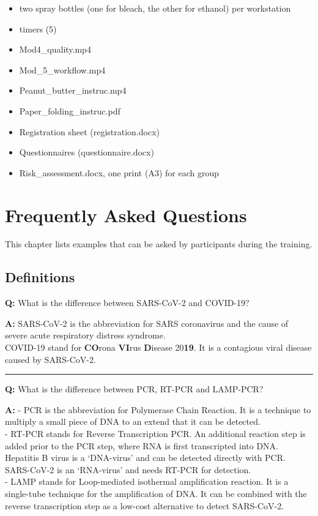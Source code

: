 \documentclass[
]{book}
\begin{document}
\begin{itemize}
\item
  two spray bottles (one for bleach, the other for ethanol) per workstation
\item
  timers (5)
\item
  Mod4\_quality.mp4
\item
  Mod\_5\_workflow.mp4
\item
  Peanut\_butter\_instruc.mp4
\item
  Paper\_folding\_instruc.pdf
\item
  Registration sheet (registration.docx)
\item
  Questionnaires (questionnaire.docx)
\item
  Risk\_assessment.docx, one print (A3) for each group
\end{itemize}

\hypertarget{FAQ}{%
\chapter{Frequently Asked Questions}\label{FAQ}}

This chapter lists examples that can be asked by participants during the training.

\hypertarget{definitions}{%
\section{Definitions}\label{definitions}}

\textbf{Q:} What is the difference between SARS-CoV-2 and COVID-19?

\textbf{A:} SARS-CoV-2 is the abbreviation for SARS coronavirus and the cause of severe acute respiratory distress syndrome.\\
COVID-19 stand for \textbf{CO}rona \textbf{VI}rus \textbf{D}isease 20\textbf{19}. It is a contagious viral disease caused by SARS-CoV-2.

\begin{center}\rule{0.5\linewidth}{0.5pt}\end{center}

\textbf{Q:} What is the difference between PCR, RT-PCR and LAMP-PCR?

\textbf{A:} - PCR is the abbreviation for Polymerase Chain Reaction. It is a technique to multiply a small piece of DNA to an extend that it can be detected.\\
- RT-PCR stands for Reverse Transcription PCR. An additional reaction step is added prior to the PCR step, where RNA is first transcripted into DNA. Hepatitis B virus is a `DNA-virus' and can be detected directly with PCR. SARS-CoV-2 is an `RNA-virus' and needs RT-PCR for detection.\\
- LAMP stands for Loop-mediated isothermal amplification reaction. It is a single-tube technique for the amplification of DNA. It can be combined with the reverse transcription step as a low-cost alternative to detect SARS-CoV-2.
\end{document}
